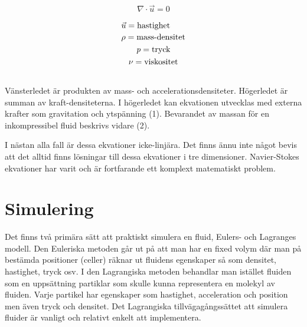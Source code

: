 \documentclass[a4paper,12pt,oneside,final]{extarticle}
\begin{document}
\begin{equation}
\nabla \cdot \vec{u} = 0
\end{equation}

\begin{equation*}
\begin{aligned}
\begin{multlined}
\vec{u} = \mbox{hastighet} \\
\rho = \mbox{mass-densitet} \\
\it{p} = \mbox{tryck} \\
\nu = \mbox{viskositet} \\
\end{multlined}
\end{aligned}
\end{equation*}
Vänsterledet är produkten av mass- och accelerationsdensiteter.
Högerledet är summan av kraft-densiteterna.
I högerledet kan ekvationen utvecklas med externa krafter som gravitation och ytspänning (1).
Bevarandet av massan för en inkompressibel fluid beskrivs vidare (2).

I nästan alla fall är dessa ekvationer icke-linjära.
Det finns ännu inte något bevis att det alltid finns lösningar till dessa ekvationer i tre dimensioner.
Navier-Stokes ekvationer har varit och är fortfarande ett komplext matematiskt problem.

\section{Simulering}
Det finns två primära sätt att praktiskt simulera en fluid, Eulers- och Lagranges modell.
Den Euleriska metoden går ut på att man har en fixed volym där man på bestämda positioner (celler) räknar ut fluidens egenskaper så som densitet, hastighet, tryck osv.
I den Lagrangiska metoden behandlar man istället fluiden som en uppsättning partiklar som skulle kunna representera en molekyl av fluiden.
Varje partikel har egenskaper som hastighet, acceleration och position men även tryck och densitet.
Det Lagrangiska tillvägagångssättet att simulera fluider är vanligt och relativt enkelt att implementera.
\end{document}
